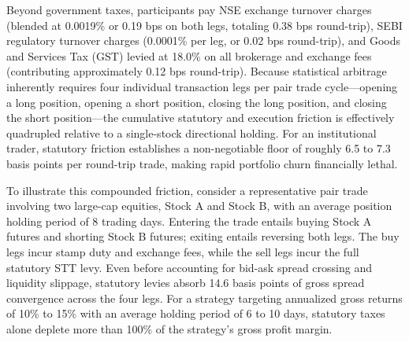 Beyond government taxes, participants pay NSE exchange turnover charges (blended at 0.0019\% or 0.19 bps on both legs, totaling 0.38 bps round-trip), SEBI regulatory turnover charges (0.0001\% per leg, or 0.02 bps round-trip), and Goods and Services Tax (GST) levied at 18.0\% on all brokerage and exchange fees (contributing approximately 0.12 bps round-trip). Because statistical arbitrage inherently requires four individual transaction legs per pair trade cycle—opening a long position, opening a short position, closing the long position, and closing the short position—the cumulative statutory and execution friction is effectively quadrupled relative to a single-stock directional holding. For an institutional trader, statutory friction establishes a non-negotiable floor of roughly 6.5 to 7.3 basis points per round-trip trade, making rapid portfolio churn financially lethal.

To illustrate this compounded friction, consider a representative pair trade involving two large-cap equities, Stock A and Stock B, with an average position holding period of 8 trading days. Entering the trade entails buying Stock A futures and shorting Stock B futures; exiting entails reversing both legs. The buy legs incur stamp duty and exchange fees, while the sell legs incur the full statutory STT levy. Even before accounting for bid-ask spread crossing and liquidity slippage, statutory levies absorb 14.6 basis points of gross spread convergence across the four legs. For a strategy targeting annualized gross returns of 10\% to 15\% with an average holding period of 6 to 10 days, statutory taxes alone deplete more than 100\% of the strategy's gross profit margin.

